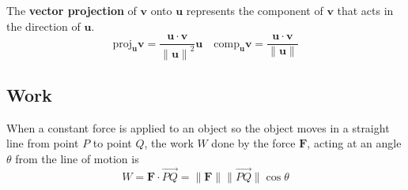 \documentclass{article}
\begin{document}
The \textbf{vector projection} of $\mathbf{v}$ onto $\mathbf{u}$ represents the component of $\mathbf{v}$ that acts in the direction of $\mathbf{u}$.
\[\text{proj}_\mathbf{u} \mathbf{v} = \frac{\mathbf{u}\cdot\mathbf{v}}{{\|\mathbf{u}\|}^2} \mathbf{u} \quad \text{comp}_\mathbf{u} \mathbf{v} = \frac{\mathbf{u}\cdot\mathbf{v}}{\|\mathbf{u}\|}\]

\subsection*{Work}
When a constant force is applied to an object so the object moves in a straight line from point $P$ to point $Q$, the work $W$ done by the force $\mathbf{F}$, acting at an angle $\theta$ from the line of motion is
\[W=\mathbf{F}\cdot \overrightarrow{PQ} = \|\mathbf{F}\|\|\overrightarrow{PQ}\|\cos\theta\]
\end{document}

